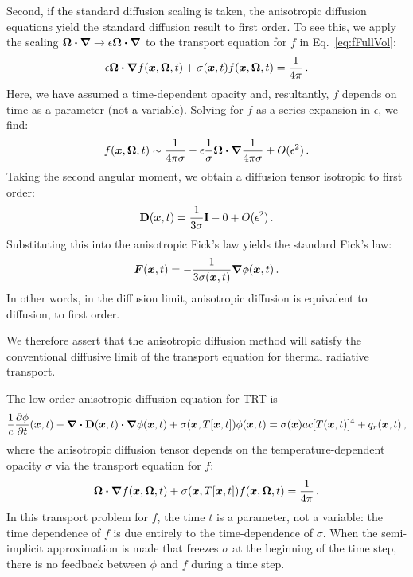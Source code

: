 Second, if the standard diffusion scaling is taken, the anisotropic diffusion
equations yield the standard diffusion result to first order. To see this, we
apply the scaling $\bm{\Omega}\bm{\cdot} \bm{\nabla} \to \epsilon \bm{\Omega}\bm{\cdot} \bm{\nabla}$ to
the transport equation for $f$ in Eq.~\eqref{eq:fFullVol}:
\begin{equation*}
  \epsilon \bm{\Omega}\bm{\cdot} \bm{\nabla} f(\bm{x}, \bm{\Omega}, t)
  + \sigma(\bm{x},t) f(\bm{x}, \bm{\Omega}, t)
  = \frac{1}{4\pi}\,.
\end{equation*}
Here, we have assumed a time-dependent opacity and, resultantly, $f$ depends on
time as a parameter (not a variable). Solving for $f$ as a series expansion in
$\epsilon$, we find:
\begin{align*}
  f(\bm{x}, \bm{\Omega}, t)
  \sim
  \frac{1}{4\pi \sigma}
  - \epsilon 
  \frac{1}{\sigma} \bm{\Omega}\bm{\cdot} \bm{\nabla} \frac{1}{4\pi \sigma}
  + O( \epsilon^2)\,.
\end{align*}
Taking the second angular moment, we obtain a diffusion tensor isotropic to
first order:
\begin{equation*}
  \mathbf{D}(\bm{x}, t)
  =
  \frac{1}{3 \sigma} \mathbf{I}
  - 0
  + O( \epsilon^2)\,.
\end{equation*}
Substituting this into the anisotropic Fick's law yields the standard Fick's
law:
\begin{equation*}
  \bm{F}(\bm{x},t) = - \frac{1}{3 \sigma(\bm{x},t)} \bm{\nabla} \phi(\bm{x},t)\,.
\end{equation*}
In other words, in the diffusion limit, anisotropic diffusion is equivalent to
diffusion, to first order.

We therefore assert that the anisotropic diffusion method will
satisfy the conventional diffusive limit of the transport equation for thermal
radiative transport.

The low-order anisotropic diffusion equation for TRT is
\begin{equation*}
\frac{1}{c} \frac{\partial \phi}{\partial t} (\bm{x}, t)
  - \bm{\nabla} \bm{\cdot} \mathbf{D}(\bm{x},t) \bm{\cdot} \bm{\nabla} \phi(\bm{x},t)
  + \sigma(\bm{x}, T[\bm{x}, t]) \phi(\bm{x}, t)
  = \sigma(\bm{x}) ac [T(\bm{x}, t)]^4 + q_{r}(\bm{x}, t)\,,
\end{equation*}
where the anisotropic diffusion tensor depends on the temperature-dependent
opacity $\sigma$ via the transport equation for $f$:
\begin{equation*}
  \bm{\Omega}\bm{\cdot} \bm{\nabla} f(\bm{x}, \bm{\Omega}, t)
  + \sigma(\bm{x},T[\bm{x},t]) f(\bm{x}, \bm{\Omega}, t)
  = \frac{1}{4\pi}\,.
\end{equation*}
In this transport problem for $f$, the time $t$ is a parameter, not a variable:
the time dependence of $f$ is due entirely to the time-dependence of $\sigma$.
When the semi-implicit approximation is made that freezes $\sigma$ at the
beginning of the time step, there is no feedback between $\phi$ and $f$ during a
time step.


